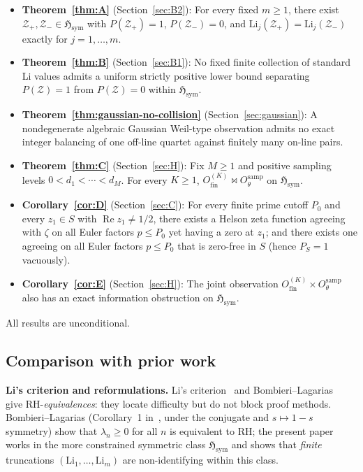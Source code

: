 \documentclass[12pt]{amsart}
\theoremstyle{definition}
\theoremstyle{remark}
\theoremstyle{plain}
\newcommand{\Hsym}{\mathfrak{H}_{\mathrm{sym}}}
\newcommand{\Li}{\mathrm{Li}}
\newcommand{\Ofinite}{O_{\mathrm{fin}}}
\newcommand{\Otheta}{O_{\theta}^{\mathrm{samp}}}
\newcommand{\re}{\operatorname{Re}}
\newcommand{\incomp}{\mathbin{\bowtie}}
\begin{document}
\begin{itemize}
\item \textbf{Theorem~\ref{thm:A}} (Section~\ref{sec:B2}): For every fixed $m\geq 1$,
  there exist $\mathcal{Z}_+, \mathcal{Z}_- \in \Hsym$ with
  $P(\mathcal{Z}_+) = 1$, $P(\mathcal{Z}_-) = 0$, and
  $\Li_j(\mathcal{Z}_+) = \Li_j(\mathcal{Z}_-)$ exactly for $j=1,\ldots,m$.

\item \textbf{Theorem~\ref{thm:B}} (Section~\ref{sec:B1}): No fixed finite collection
  of standard Li values admits a uniform strictly positive lower bound
  separating $P(\mathcal{Z}) = 1$ from $P(\mathcal{Z}) = 0$ within $\Hsym$.

\item \textbf{Theorem~\ref{thm:gaussian-no-collision}}
  (Section~\ref{sec:gaussian}): A nondegenerate algebraic Gaussian Weil-type
  observation admits no exact integer balancing of one off-line quartet
  against finitely many on-line pairs.

\item \textbf{Theorem~\ref{thm:C}} (Section~\ref{sec:H}): Fix $M \geq 1$ and
  positive sampling levels $0 < d_1 < \cdots < d_M$.  For every $K \geq 1$,
  $\Ofinite^{(K)} \incomp \Otheta$ on $\Hsym$.

\item \textbf{Corollary~\ref{cor:D}} (Section~\ref{sec:C}): For every finite prime
  cutoff $P_0$ and every $z_1 \in S$ with $\re z_1 \neq 1/2$, there
  exists a Helson zeta function agreeing with $\zeta$ on all Euler
  factors $p \leq P_0$ yet having a zero at $z_1$; and there exists one
  agreeing on all Euler factors $p \leq P_0$ that is zero-free in $S$
  (hence $P_S = 1$ vacuously).

\item \textbf{Corollary~\ref{cor:E}} (Section~\ref{sec:H}): The joint observation
  $\Ofinite^{(K)} \times \Otheta$ also has an exact information obstruction
  on $\Hsym$.
\end{itemize}

All results are unconditional.

\subsection*{Comparison with prior work}

\textbf{Li's criterion and reformulations.}
Li's criterion~\cite{Li1997} and Bombieri--Lagarias~\cite{BombieriLagarias1999}
give RH-\emph{equivalences}: they locate difficulty but do not block proof
methods.  Bombieri--Lagarias (Corollary~1 in~\cite{BombieriLagarias1999},
under the conjugate and $s\mapsto 1-s$ symmetry)
show that $\lambda_n \geq 0$ for all $n$ is equivalent to RH;
the present paper works in the more
constrained symmetric class $\Hsym$ and shows that \emph{finite} truncations
$(\Li_1,\ldots,\Li_m)$ are non-identifying within this class.
\end{document}
